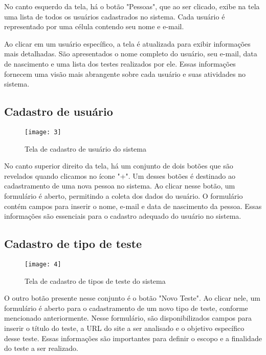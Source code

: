 No canto esquerdo da tela, há o botão "Pessoas", que ao ser clicado, exibe na tela uma lista de todos os usuários cadastrados no sistema. Cada usuário é representado por uma célula contendo seu nome e e-mail.

Ao clicar em um usuário específico, a tela é atualizada para exibir informações mais detalhadas. São apresentados o nome completo do usuário, seu e-mail, data de nascimento e uma lista dos testes realizados por ele. Essas informações fornecem uma visão mais abrangente sobre cada usuário e suas atividades no sistema.

\clearpage
\subsection{Cadastro de usuário}

\begin{figure}[h]
  \caption{Tela de cadastro de usuário do sistema}
  \centering
  \texttt{[image: 3]}
\end{figure}
\FloatBarrier

No canto superior direito da tela, há um conjunto de dois botões que são revelados quando clicamos no ícone "+". Um desses botões é destinado ao cadastramento de uma nova pessoa no sistema. Ao clicar nesse botão, um formulário é aberto, permitindo a coleta dos dados do usuário. O formulário contém campos para inserir o nome, e-mail e data de nascimento da pessoa. Essas informações são essenciais para o cadastro adequado do usuário no sistema.

\clearpage
\subsection{Cadastro de tipo de teste}

\begin{figure}[h]
  \caption{Tela de cadastro de tipos de teste do sistema}
  \centering
  \texttt{[image: 4]}
\end{figure}
\FloatBarrier

O outro botão presente nesse conjunto é o botão "Novo Teste". Ao clicar nele, um formulário é aberto para o cadastramento de um novo tipo de teste, conforme mencionado anteriormente. Nesse formulário, são disponibilizados campos para inserir o título do teste, a URL do site a ser analisado e o objetivo específico desse teste. Essas informações são importantes para definir o escopo e a finalidade do teste a ser realizado.

